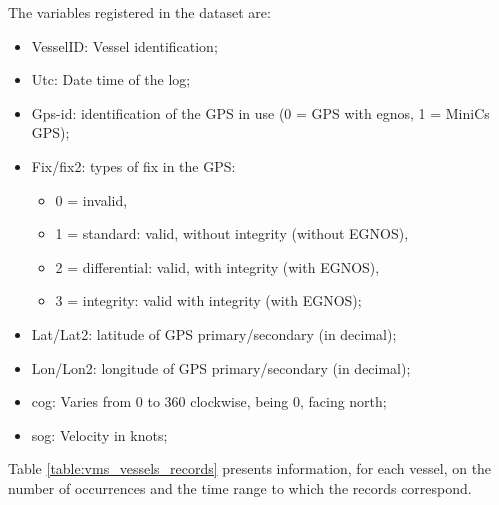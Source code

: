 The variables registered in the dataset are:

\begin{itemize}
\item VesselID: Vessel identification;
\item Utc: Date time of the log;
\item Gps-id: identification of the GPS in use (0 = GPS with \gls{egnos}, 1 = MiniCs GPS);
\item Fix/fix2: types of fix in the GPS:
\begin{itemize}
\item 0 = invalid, 
\item 1 = standard: valid, without integrity (without EGNOS), 
\item 2 = differential: valid, with integrity (with EGNOS), 
\item 3 = integrity: valid with integrity (with EGNOS);
\end{itemize}
\item Lat/Lat2: latitude of GPS primary/secondary (in decimal);
\item Lon/Lon2: longitude of GPS primary/secondary (in decimal);
\item \gls{cog}: Varies from 0 to 360 clockwise, being 0, facing north;
\item \gls{sog}: Velocity in knots;


\end{itemize}

Table \ref{table:vms_vessels_records} presents information, for each vessel, on the number of occurrences and the time range to which the records correspond.

